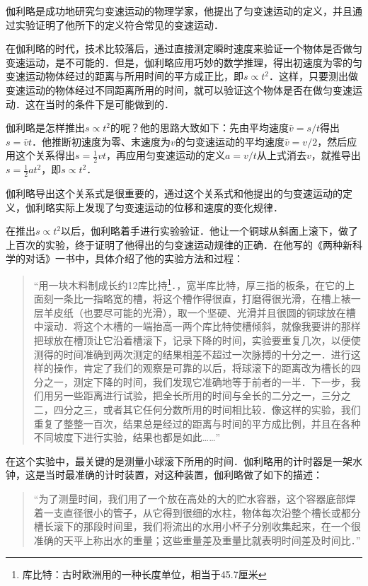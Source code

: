 \begin{History}[伽利略对匀变速运动的研究]
伽利略是成功地研究匀变速运动的物理学家，他提出了匀变速运动的定义，并且通过实验证明了他所下的定义符合常见的变速运动．

在伽利略的时代，技术比较落后，通过直接测定瞬时速度来验证一个物体是否做匀变速运动，是不可能的．但是，伽利略应用巧妙的数学推理，得出初速度为零的匀变速运动物体经过的距离与所用时间的平方成正比，即$s\propto t^2$．这样，只要测出做变速运动的物体经过不同距离所用的时间，就可以验证这个物体是否在做匀变速运动．这在当时的条件下是可能做到的．

伽利略是怎样推出$s\propto t^2$的呢？他的思路大致如下：先由平均速度$\bar v=s/t$得出$s=\bar v t$．他推断初速度为零、末速度为$v$的匀变速运动的平均速度$\bar v=v/2$，然后应用这个关系得出$s=\frac{1}{2} v t$，再应用匀变速运动的定义$a=v/t$从上式消去$v$，就推导出$s=\frac{1}{2} a t^2$，即$s\propto t^2$．

伽利略导出这个关系式是很重要的，通过这个关系式和他提出的匀变速运动的定义，伽利略实际上发现了匀变速运动的位移和速度的变化规律．

在推出$s\propto t^2$以后，伽利略着手进行实验验证．他让一个铜球从斜面上滚下，做了上百次的实验，终于证明了他得出的匀变速运动规律的正确．在他写的《两种新科学的对话》一书中，具体介绍了他的实验方法和过程：

\begin{quotation}
    “用一块木料制成长约12库比持\footnote{库比特：古时欧洲用的一种长度单位，相当于45.7厘米}．，宽半库比特，厚三指的板条，在它的上面刻一条比一指略宽的槽，将这个槽作得很直，打磨得很光滑，在槽上裱一层羊皮纸（也要尽可能的光滑），取一个坚硬、光滑并且很圆的铜球放在槽中滚动．将这个木槽的一端抬高一两个库比特使槽倾斜，就像我要讲的那样把球放在槽顶让它沿着槽滚下，记录下降的时间，实验要重复几次，以便使测得的时间准确到两次测定的结果相差不超过一次脉搏的十分之一．进行这样的操作，肯定了我们的观察是可靠的以后，将球滚下的距离改为槽长的四分之一，测定下降的时间，我们发现它准确地等于前者的一半．下一步，我们用另一些距离进行试验，把全长所用的时间与全长的二分之一，三分之二，四分之三，或者其它任何分数所用的时间相比较．像这样的实验，我们重复了整整一百次，结果总是经过的距离与时间的平方成比例，并且在各种不同坡度下进行实验，结果也都是如此……”
\end{quotation}

在这个实验中，最关键的是测量小球滚下所用的时间．伽利略用的计时器是一架水钟，这是当时最准确的计时装置，对这种装置，伽利略做了如下的描述：

\begin{quotation}
    “为了测量时间，我们用了一个放在高处的大的贮水容器，这个容器底部焊着一支直径很小的管子，从它得到很细的水柱，物体每次沿整个槽长或都分槽长滚下的那段时间里，我们将流出的水用小杯子分别收集起来，在一个很准确的天平上称出水的重量；这些重量差及重量比就表明时间差及时间比．”
\end{quotation}


\end{History}
